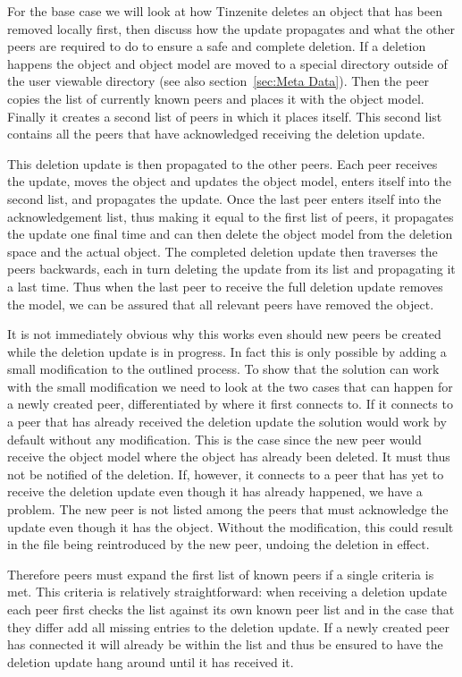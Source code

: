 For the base case we will look at how Tinzenite deletes an object that has been removed locally first, then discuss how the update propagates and what the other peers are required to do to ensure a safe and complete deletion.
If a deletion happens the object and object model are moved to a special directory outside of the user viewable directory (see also section~\ref{sec:Meta Data}).
Then the peer copies the list of currently known peers and places it with the object model.
Finally it creates a second list of peers in which it places itself.
This second list contains all the peers that have acknowledged receiving the deletion update.

This deletion update is then propagated to the other peers.
Each peer receives the update, moves the object and updates the object model, enters itself into the second list, and propagates the update.
Once the last peer enters itself into the acknowledgement list, thus making it equal to the first list of peers, it propagates the update one final time and can then delete the object model from the deletion space and the actual object.
The completed deletion update then traverses the peers backwards, each in turn deleting the update from its list and propagating it a last time.
Thus when the last peer to receive the full deletion update removes the model, we can be assured that all relevant peers have removed the object.

It is not immediately obvious why this works even should new peers be created while the deletion update is in progress.
In fact this is only possible by adding a small modification to the outlined process.
To show that the solution can work with the small modification we need to look at the two cases that can happen for a newly created peer, differentiated by where it first connects to.
If it connects to a peer that has already received the deletion update the solution would work by default without any modification.
This is the case since the new peer would receive the object model where the object has already been deleted.
It must thus not be notified of the deletion.
If, however, it connects to a peer that has yet to receive the deletion update even though it has already happened, we have a problem.
The new peer is not listed among the peers that must acknowledge the update even though it has the object.
Without the modification, this could result in the file being reintroduced by the new peer, undoing the deletion in effect.

Therefore peers must expand the first list of known peers if a single criteria is met.
This criteria is relatively straightforward: when receiving a deletion update each peer first checks the list against its own known peer list and in the case that they differ add all missing entries to the deletion update.
If a newly created peer has connected it will already be within the list and thus be ensured to have the deletion update hang around until it has received it.

